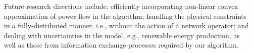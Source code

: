 \documentclass{IEEEtran}  %
\newcommand{\0}{\mathbf{0}}
\newcommand{\1}{\mathbf{1}}
\begin{document}
Future research directions include: efficiently incorporating non-linear convex approximation of power flow in the algorithm; handling the physical constraints in a fully-distributed manner, i.e., without the action of a network operator; and dealing with uncertainties in the model, e.g., renewable energy production, as well as those from information exchange processes required by our algorithm.

\balance



\newpage

\end{document}
